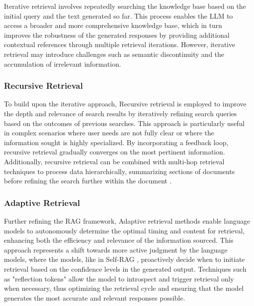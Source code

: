 Iterative retrieval involves repeatedly searching the knowledge base based on the initial query and the text generated so far. This process enables the LLM to access a broader and more comprehensive knowledge base, which in turn improves the robustness of the generated responses by providing additional contextual references through multiple retrieval iterations. However, iterative retrieval may introduce challenges such as semantic discontinuity and the accumulation of irrelevant information.

\subsubsection{Recursive Retrieval}

To build upon the iterative approach, Recursive retrieval is employed to improve the depth and relevance of search results by iteratively refining search queries based on the outcomes of previous searches. This approach is particularly useful in complex scenarios where user needs are not fully clear or where the information sought is highly specialized. By incorporating a feedback loop, recursive retrieval gradually converges on the most pertinent information. Additionally, recursive retrieval can be combined with multi-hop retrieval techniques to process data hierarchically, summarizing sections of documents before refining the search further within the document \cite{gao2023retrieval}.

\subsubsection{Adaptive Retrieval}

Further refining the RAG framework, Adaptive retrieval methods enable language models to autonomously determine the optimal timing and content for retrieval, enhancing both the efficiency and relevance of the information sourced. This approach represents a shift towards more active judgment by the language models, where the models, like in Self-RAG \cite{asai2023self}, proactively decide when to initiate retrieval based on the confidence levels in the generated output. Techniques such as "reflection tokens" allow the model to introspect and trigger retrieval only when necessary, thus optimizing the retrieval cycle and ensuring that the model generates the most accurate and relevant responses possible.

